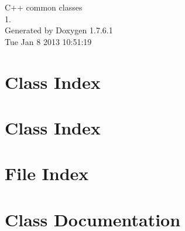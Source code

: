 \documentclass[a4paper]{book}
\begin{document}
\hypersetup{pageanchor=false,citecolor=blue}
\begin{titlepage}
\vspace*{7cm}
\begin{center}
{\Large \-C++ common classes \\[1ex]\large 1. }\\
\vspace*{1cm}
{\large \-Generated by Doxygen 1.7.6.1}\\
\vspace*{0.5cm}
{\small Tue Jan 8 2013 10:51:19}\\
\end{center}
\end{titlepage}
\clearemptydoublepage
{}
\tableofcontents
\clearemptydoublepage
{}
\hypersetup{pageanchor=true,citecolor=blue}
\chapter{\-Class \-Index}

\chapter{\-Class \-Index}

\chapter{\-File \-Index}

\chapter{\-Class \-Documentation}
















































\end{document}
